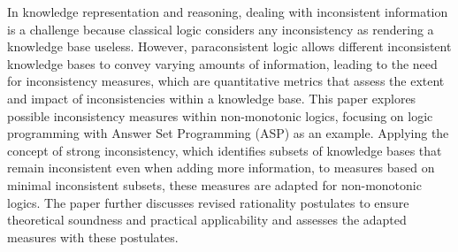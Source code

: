 In knowledge representation and reasoning, dealing with inconsistent information is a challenge because classical logic considers any inconsistency as rendering a knowledge base useless. However, paraconsistent logic allows different inconsistent knowledge bases to convey varying amounts of information, leading to the need for inconsistency measures, which are quantitative metrics that assess the extent and impact of inconsistencies within a knowledge base. This paper explores possible inconsistency measures within non-monotonic logics, focusing on logic programming with Answer Set Programming (ASP) as an example. Applying the concept of strong inconsistency, which identifies subsets of knowledge bases that remain inconsistent even when adding more information, to measures based on minimal inconsistent subsets, these measures are adapted for non-monotonic logics. The paper further discusses revised rationality postulates to ensure theoretical soundness and practical applicability and assesses the adapted measures with these postulates.
